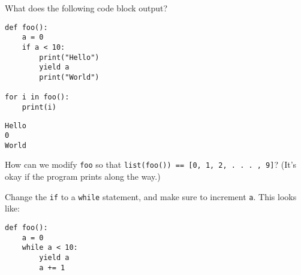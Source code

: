 \begin{blocksection}
\question What does the following code block output?

\begin{lstlisting}
def foo():
    a = 0
    if a < 10:
        print("Hello")
        yield a
        print("World")

for i in foo():
    print(i)
\end{lstlisting}

\begin{solution}[0.75in]
\begin{lstlisting}
Hello
0
World
\end{lstlisting}
\end{solution}
\end{blocksection}

\begin{blocksection}
\question How can we modify \lstinline$foo$ so that \lstinline$list(foo()) == [0, 1, 2, . . . , 9]$? (It's okay if the program prints along the way.)

\begin{solution}[0.50in]
Change the \lstinline$if$ to a \lstinline$while$ statement, and make sure to increment
\lstinline$a$. This looks like:

\begin{lstlisting}
def foo():
    a = 0
    while a < 10:
        yield a
        a += 1
\end{lstlisting}
\end{solution}
\end{blocksection}
